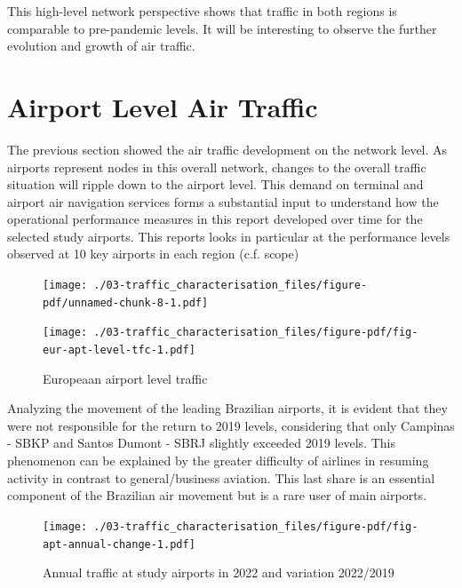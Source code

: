 \documentclass[
  a4paper,
  DIV=11,
  numbers=noendperiod]{scrreport}
\begin{document}
This high-level network perspective shows that traffic in both regions
is comparable to pre-pandemic levels. It will be interesting to observe
the further evolution and growth of air traffic.

\hypertarget{airport-level-air-traffic}{%
\section{Airport Level Air Traffic}\label{airport-level-air-traffic}}

The previous section showed the air traffic development on the network
level. As airports represent nodes in this overall network, changes to
the overall traffic situation will ripple down to the airport level.
This demand on terminal and airport air navigation services forms a
substantial input to understand how the operational performance measures
in this report developed over time for the selected study airports. This
reports looks in particular at the performance levels observed at 10 key
airports in each region (c.f. scope)

\begin{figure}[H]

{\centering \texttt{[image: ./03-traffic\_characterisation\_files/figure-pdf/unnamed-chunk-8-1.pdf]}

}

\end{figure}

\begin{figure}[H]

{\centering \texttt{[image: ./03-traffic\_characterisation\_files/figure-pdf/fig-eur-apt-level-tfc-1.pdf]}

}

\caption{\label{fig-eur-apt-level-tfc}Europeaan airport level traffic}

\end{figure}

Analyzing the movement of the leading Brazilian airports, it is evident
that they were not responsible for the return to 2019 levels,
considering that only Campinas - SBKP and Santos Dumont - SBRJ slightly
exceeded 2019 levels. This phenomenon can be explained by the greater
difficulty of airlines in resuming activity in contrast to
general/business aviation. This last share is an essential component of
the Brazilian air movement but is a rare user of main airports.

\begin{figure}[H]

{\centering \texttt{[image: ./03-traffic\_characterisation\_files/figure-pdf/fig-apt-annual-change-1.pdf]}

}

\caption{\label{fig-apt-annual-change}Annual traffic at study airports
in 2022 and variation 2022/2019}

\end{figure}
\end{document}
